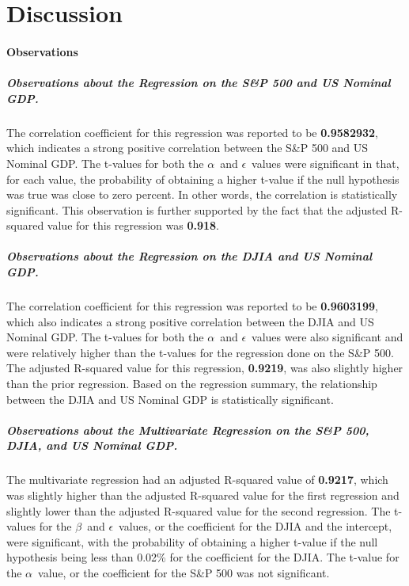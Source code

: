 \documentclass[11pt]{article}
\numberwithin{equation}{section}
\def\alp{\mbox{\boldmath$\alpha$\unboldmath}}
\def\bet{\mbox{\boldmath$\beta$\unboldmath}}
\def\epsi{\mbox{\boldmath$\epsilon$\unboldmath}}
\begin{document}
\section{Discussion}

\paragraph{Observations}
\subparagraph{Observations about the Regression on the S\&P 500 and US Nominal GDP.}
The correlation coefficient for this regression was reported to be \textbf{0.9582932}, which indicates a strong positive correlation between the S\&P 500 and US Nominal GDP. The t-values for both the \alp\, and \epsi\, values were significant in that, for each value, the probability of obtaining a higher t-value if the null hypothesis was true was close to zero percent. In other words, the correlation is statistically significant. This observation is further supported by the fact that the adjusted R-squared value for this regression was \textbf{0.918}.

\subparagraph{Observations about the Regression on the DJIA and US Nominal GDP.}
The correlation coefficient for this regression was reported to be \textbf{0.9603199}, which also indicates a strong positive correlation between the DJIA and US Nominal GDP. The t-values for both the \alp\, and \epsi\, values were also significant and were relatively higher than the t-values for the regression done on the S\&P 500. The adjusted R-squared value for this regression, \textbf{0.9219}, was also slightly higher than the prior regression. Based on the regression summary, the relationship between the DJIA and US Nominal GDP is statistically significant.

\subparagraph{Observations about the Multivariate Regression on the S\&P 500, DJIA, and US Nominal GDP.}
The multivariate regression had an adjusted R-squared value of \textbf{0.9217}, which was slightly higher than the adjusted R-squared value for the first regression and slightly lower than the adjusted R-squared value for the second regression. The t-values for the \bet\, and \epsi\, values, or the coefficient for the DJIA and the intercept, were significant, with the probability of obtaining a higher t-value if the null hypothesis being less than 0.02\% for the coefficient for the DJIA. The t-value for the \alp\, value, or the coefficient for the S\&P 500 was not significant. 
\end{document}
